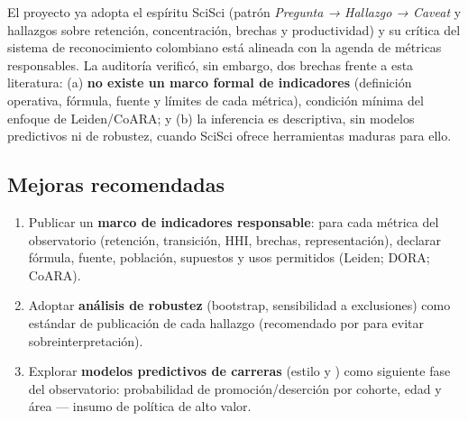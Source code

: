 El proyecto ya adopta el espíritu SciSci (patrón \emph{Pregunta →
Hallazgo → Caveat} y hallazgos sobre retención, concentración, brechas y
productividad) y su crítica del sistema de reconocimiento colombiano está
alineada con la agenda de métricas responsables. La auditoría verificó, sin
embargo, dos brechas frente a esta literatura: (a) \textbf{no existe un marco
formal de indicadores} (definición operativa, fórmula, fuente y límites de cada
métrica), condición mínima del enfoque de Leiden/CoARA; y (b) la inferencia es
descriptiva, sin modelos predictivos ni de robustez, cuando SciSci ofrece
herramientas maduras para ello.

\subsection{Mejoras recomendadas}

\begin{enumerate}
  \item Publicar un \textbf{marco de indicadores responsable}: para cada métrica
        del observatorio (retención, transición, HHI, brechas, representación),
        declarar fórmula, fuente, población, supuestos y usos permitidos
        (Leiden; DORA; CoARA).
  \item Adoptar \textbf{análisis de robustez} (bootstrap, sensibilidad a
        exclusiones) como estándar de publicación de cada hallazgo
        (recomendado por \citet{hicks2015leiden} para evitar sobreinterpretación).
  \item Explorar \textbf{modelos predictivos de carreras} (estilo
        \citet{clauset2017data} y \citet{wang2021sciencebook}) como siguiente
        fase del observatorio: probabilidad de promoción/deserción por cohorte,
        edad y área — insumo de política de alto valor.
\end{enumerate}
